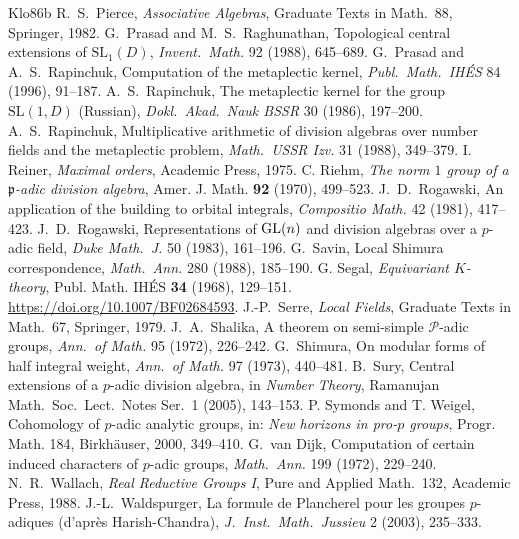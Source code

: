 \begin{thebibliography}{Klo86b}
 R.~S.~Pierce, \emph{Associative Algebras}, Graduate Texts in Math.\ 88, Springer, 1982.
 G.~Prasad and M.~S.~Raghunathan, Topological central extensions of $\mathrm{SL}_1(D)$, \emph{Invent.\ Math.} 92 (1988), 645--689.
 G.~Prasad and A.~S.~Rapinchuk, Computation of the metaplectic kernel, \emph{Publ.\ Math.\ IH\'ES} 84 (1996), 91--187.
 A.~S.~Rapinchuk, The metaplectic kernel for the group $\mathrm{SL}(1,D)$ (Russian), \emph{Dokl.\ Akad.\ Nauk BSSR} 30 (1986), 197--200.
 A.~S.~Rapinchuk, Multiplicative arithmetic of division algebras over number fields and the metaplectic problem, \emph{Math.\ USSR Izv.} 31 (1988), 349--379.
 I. Reiner, \emph{Maximal orders}, Academic Press, 1975.
 C. Riehm, \emph{The norm $1$ group of a $\mathfrak p$-adic division algebra}, Amer. J. Math. \textbf{92} (1970), 499--523.
 J.~D.~Rogawski, An application of the building to orbital integrals, \emph{Compositio Math.} 42 (1981), 417--423.
 J.~D.~Rogawski, Representations of $\mathrm{GL}(n)$ and division algebras over a $p$-adic field, \emph{Duke Math.\ J.} 50 (1983), 161--196.
 G.~Savin, Local Shimura correspondence, \emph{Math.\ Ann.} 280 (1988), 185--190.
 G. Segal, \emph{Equivariant $K$-theory}, Publ. Math. IH\'ES \textbf{34} (1968), 129--151. \url{https://doi.org/10.1007/BF02684593}.
 J.-P.~Serre, \emph{Local Fields}, Graduate Texts in Math.\ 67, Springer, 1979.
 J.~A.~Shalika, A theorem on semi-simple $\mathcal P$-adic groups, \emph{Ann.\ of Math.} 95 (1972), 226--242.
 G.~Shimura, On modular forms of half integral weight, \emph{Ann.\ of Math.} 97 (1973), 440--481.
 B.~Sury, Central extensions of a $p$-adic division algebra, in \emph{Number Theory}, Ramanujan Math.\ Soc.\ Lect.\ Notes Ser.\ 1 (2005), 143--153.
 P. Symonds and T. Weigel, Cohomology of $p$-adic analytic groups, in: \emph{New horizons in pro-$p$ groups}, Progr. Math. 184, Birkh\"auser, 2000, 349--410.
 G.~van Dijk, Computation of certain induced characters of $p$-adic groups, \emph{Math.\ Ann.} 199 (1972), 229--240.
 N.~R.~Wallach, \emph{Real Reductive Groups I}, Pure and Applied Math.\ 132, Academic Press, 1988.
 J.-L.~Waldspurger, La formule de Plancherel pour les groupes $p$-adiques (d'apr\`es Harish-Chandra), \emph{J.\ Inst.\ Math.\ Jussieu} 2 (2003), 235--333.

\end{thebibliography}
